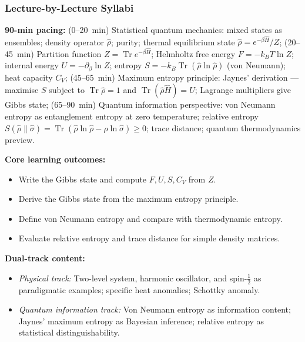 \documentclass[11pt,a4paper]{article}
\begin{document}
\subsubsection*{Lecture-by-Lecture Syllabi}

\begin{tcolorbox}[modulebox, title={Module~II.7 --- Lecture L01: Density Operators in Thermodynamics}]
\textbf{90-min pacing:} (0--20~min) Statistical quantum mechanics: mixed states as ensembles; density operator $\hat\rho$; purity; thermal equilibrium state $\hat\rho=e^{-\beta\hat{H}}/Z$; (20--45~min) Partition function $Z=\operatorname{Tr}e^{-\beta\hat{H}}$; Helmholtz free energy $F=-k_BT\ln Z$; internal energy $U=-\partial_\beta\ln Z$; entropy $S=-k_B\operatorname{Tr}(\hat\rho\ln\hat\rho)$ (von Neumann); heat capacity $C_V$; (45--65~min) Maximum entropy principle: Jaynes' derivation --- maximise $S$ subject to $\operatorname{Tr}\hat\rho=1$ and $\operatorname{Tr}(\hat\rho\hat{H})=U$; Lagrange multipliers give Gibbs state; (65--90~min) Quantum information perspective: von Neumann entropy as entanglement entropy at zero temperature; relative entropy $S(\hat\rho\|\hat\sigma)=\operatorname{Tr}(\hat\rho\ln\hat\rho-\hat\rho\ln\hat\sigma)\geq 0$; trace distance; quantum thermodynamics preview.

\medskip\textbf{Core learning outcomes:}
\begin{itemize}[leftmargin=1.4em,topsep=2pt,itemsep=1pt]
  \item Write the Gibbs state and compute $F,U,S,C_V$ from $Z$.
  \item Derive the Gibbs state from the maximum entropy principle.
  \item Define von Neumann entropy and compare with thermodynamic entropy.
  \item Evaluate relative entropy and trace distance for simple density matrices.
\end{itemize}

\medskip\textbf{Dual-track content:}
\begin{itemize}[leftmargin=1.4em,topsep=2pt,itemsep=1pt]
  \item \textit{Physical track:} Two-level system, harmonic oscillator, and spin-$\tfrac{1}{2}$ as paradigmatic examples; specific heat anomalies; Schottky anomaly.
  \item \textit{Quantum information track:} Von Neumann entropy as information content; Jaynes' maximum entropy as Bayesian inference; relative entropy as statistical distinguishability.
\end{itemize}


\end{tcolorbox}
\end{document}
